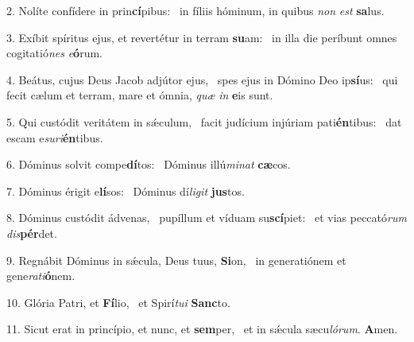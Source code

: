 2. Nolíte confídere in prin\textbf{cí}pibus: \ast\  in fíliis hóminum, in quibus \textit{non} \textit{est} \textbf{sa}lus.\

3. Exíbit spíritus ejus, et revertétur in terram \textbf{su}am: \ast\  in illa die períbunt omnes cogitatió\textit{nes} \textit{e}\textbf{ó}rum.\

4. Beátus, cujus Deus Jacob adjútor ejus, \dag\  spes ejus in Dómino Deo ip\textbf{sí}us: \ast\  qui fecit cælum et terram, mare et ómnia, \textit{quæ} \textit{in} \textbf{e}is sunt.\

5. Qui custódit veritátem in sǽculum, \dag\  facit judícium injúriam pati\textbf{én}tibus: \ast\  dat escam e\textit{su}\textit{ri}\textbf{én}tibus.\

6. Dóminus solvit compe\textbf{dí}tos: \ast\  Dóminus illú\textit{mi}\textit{nat} \textbf{cæ}cos.\

7. Dóminus érigit e\textbf{lí}sos: \ast\  Dóminus dí\textit{li}\textit{git} \textbf{jus}tos.\

8. Dóminus custódit ádvenas, \dag\  pupíllum et víduam su\textbf{scí}piet: \ast\  et vias peccató\textit{rum} \textit{dis}\textbf{pér}det.\

9. Regnábit Dóminus in sǽcula, Deus tuus, \textbf{Si}on, \ast\  in generatiónem et gene\textit{ra}\textit{ti}\textbf{ó}nem.\

10. Glória Patri, et \textbf{Fí}lio, \ast\  et Spirí\textit{tu}\textit{i} \textbf{Sanc}to.\

11. Sicut erat in princípio, et nunc, et \textbf{sem}per, \ast\  et in sǽcula sæcu\textit{ló}\textit{rum}. \textbf{A}men.\

